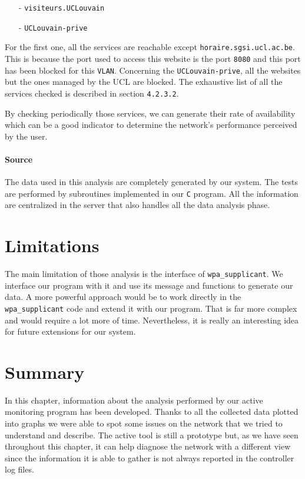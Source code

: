 \begin{itemize}
	\item [-] \texttt{visiteurs.UCLouvain}
	\item [-] \texttt{UCLouvain-prive}
\end{itemize}

For the first one, all the services are reachable except \texttt{horaire.sgsi.ucl.ac.be}. This is because the port used to access this website is the port \texttt{8080} and this port has been blocked for this \texttt{VLAN}. Concerning the \texttt{UCLouvain-prive}, all the websites but the ones managed by the UCL are blocked. The exhaustive list of all the services checked is described in section \texttt{4.2.3.2}.

By checking periodically those services, we can generate their rate of availability which can be a good indicator to determine the network's performance perceived by the user.


\paragraph*{Source} The data used in this analysis are completely generated by our system. The tests are performed by subroutines implemented in our \texttt{C} program. All the information are centralized in the server that also handles all the data analysis phase.

\section{Limitations}


The main limitation of those analysis is the interface of \texttt{wpa\_supplicant}. We interface our program with it and use its message and functions to generate our data. A more powerful approach would be to work directly in the \texttt{wpa\_supplicant} code and extend it with our program. That is far more complex and would require a lot more of time. Nevertheless, it is really an interesting idea for future extensions for our system.

\section{Summary}
In this chapter, information about the analysis performed by our active monitoring program has been developed. Thanks to all the collected data plotted into graphs we were able to spot some issues on the network that we tried to understand and describe. The active tool is still a prototype but, as we have seen throughout this chapter, it can help diagnose the network with a different view since the information it is able to gather is not always reported in the controller log files.
